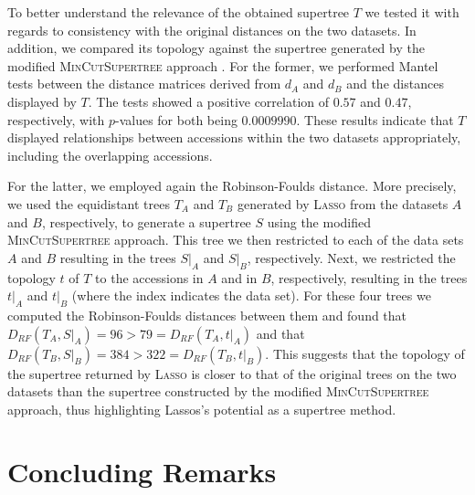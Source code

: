 To better understand the relevance of the obtained supertree $T$ we tested it
with regards to consistency with the original distances on the two
datasets. In addition, we compared its topology against the supertree
generated by the modified \textsc{MinCutSupertree} approach
\cite{page02mincut}.  For the former, we performed Mantel tests between the
distance matrices derived from $d_A$ and $d_B$ and the distances displayed by
$T$.  The tests showed a positive correlation of $0.57$ and $0.47$,
respectively, with $p$-values for both being $0.0009990$. These results
indicate that $T$ displayed relationships between accessions within the two
datasets appropriately, including the overlapping accessions.

For the latter, we employed again the Robinson-Foulds distance. More
precisely, we used the equidistant trees $T_A$ and $T_B$ generated by
\textsc{Lasso} from the datasets $A$ and $B$, respectively, to generate a
supertree $S$ using the modified \textsc{MinCutSupertree} approach. This tree
we then restricted to each of the data sets $A$ and $B$ resulting in the trees
$S|_A$ and $S|_B$, respectively. Next, we restricted the topology $t$ of $T$
to the accessions in $A$ and in $B$, respectively, resulting in the trees
$t|_A$ and $t|_B$ (where the index indicates the data set). For these four
trees we computed the Robinson-Foulds distances between them and found that
$D_{RF}(T_A,S|_A)= 96>79= D_{RF}(T_A,t|_A)$ and that $D_{RF}(T_B,S|_B)=
384>322=D_{RF}(T_B,t|_B)$.  This suggests that the topology of the supertree
returned by \textsc{Lasso} is closer to that of the original trees on the two
datasets than the supertree constructed by the modified
\textsc{MinCutSupertree} approach, thus highlighting {\sc Lassos}'s potential
as a supertree method.

\section{Concluding Remarks}
\label{sec:conclusion}


